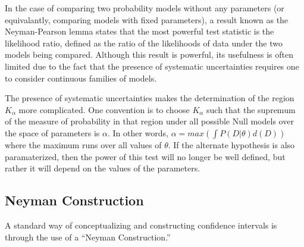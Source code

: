 In the case of comparing two probability models without any parameters (or equivalantly, comparing models with fixed parameters), a result known as the Neyman-Pearson lemma states that the most powerful test statistic is the likelihood ratio, defined as the ratio of the likelihoods of data under the two models being compared.
Although this result is powerful, its usefulness is often limited due to the fact that the presence of systematic uncertainties requires one to consider continuous families of models.

The presence of systematic uncertainties makes the determination of the region $K_{\alpha}$ more complicated.
One convention is to choose $K_{\alpha}$ such that the supremum of the measure of probability in that region under all possible Null models over the space of parameters is $\alpha$.
In other words, $\alpha = max( \int P(D|\theta) d(D) )$ where the maximum runs over all values of $\theta$.
If the alternate hypothesis is also paramaterized, then the power of this test will no longer be well defined, but rather it will depend on the values of the parameters.



\subsection{Neyman Construction}

A standard way of conceptualizing and constructing confidence intervals is through the use of a ``Neyman Construction.'' 



